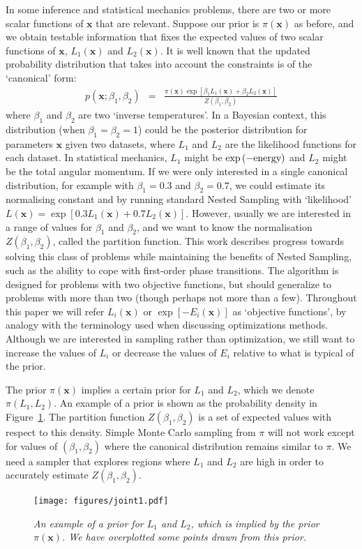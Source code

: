 \documentclass[journal,article,accept,moreauthors,pdftex,12pt,a4paper]{mdpi}
\newcommand{\xx}{\boldsymbol{x}}
\begin{document}
In some inference and
statistical mechanics problems, there are two or more scalar functions of
$\xx$ that are relevant. Suppose our prior is $\pi(\xx)$ as before, and
we obtain testable information that fixes the expected values of two scalar
functions of $\xx$, $L_1(\xx)$ and $L_2(\xx)$.
It is well known that the
updated probability distribution that takes into account the constraints is
of the `canonical' form:
\begin{eqnarray}
p(\xx; \beta_1, \beta_2) &=& \frac{\pi(\xx)\exp\left[\beta_1L_1(\xx)+\beta_2L_2(\xx)\right]}
{Z(\beta_1, \beta_2)}
\end{eqnarray}
where $\beta_1$ and $\beta_2$ are two `inverse temperatures'. In a Bayesian
context, this distribution (when $\beta_1 = \beta_2 = 1$) could be the
posterior distribution for parameters $\xx$
given two datasets, where $L_1$ and $L_2$ are the
likelihood functions for each dataset. In statistical mechanics, $L_1$ might
be $\exp\left(-\textnormal{energy}\right)$ and $L_2$ might be the total
angular momentum.
If we were only interested in a single canonical distribution, for example
with $\beta_1 = 0.3$ and $\beta_2 = 0.7$, we could estimate its normalising
constant and by running standard Nested Sampling with `likelihood'
$L(\xx) = \exp\left[0.3L_1(\xx) + 0.7L_2(\xx)\right]$. However, usually we
are interested in a range of values for $\beta_1$ and $\beta_2$, and we
want to know the normalisation $Z(\beta_1, \beta_2)$, called the
partition function. This work describes
progress towards solving this class of problems while maintaining the benefits
of Nested Sampling, such as the ability to cope with first-order phase
transitions. The algorithm is designed for problems with two objective
functions, but should generalize to problems with more than two (though perhaps
not more than a few). Throughout this paper we will refer $L_i(\xx)$ or
$\exp\left[-E_i(\xx)\right]$ as `objective functions',
by analogy with the terminology used when
discussing optimizations methods. Although we are interested in sampling rather
than optimization, we still want to increase the values of $L_i$ or decrease
the values of $E_i$ relative to what is typical of the prior.

The prior $\pi(\xx)$ implies a certain prior for $L_1$ and $L_2$, which we
denote $\pi(L_1, L_2)$. An example of a prior is shown as the
probability density in Figure~\ref{fig:joint1}. The partition function
$Z(\beta_1, \beta_2)$ is a set of expected values with respect to this density.
Simple Monte Carlo sampling from $\pi$ will not work except for values of
$(\beta_1, \beta_2)$ where the canonical distribution remains similar to $\pi$.
We need a sampler that explores regions where $L_1$ and $L_2$ are high in order
to accurately estimate $Z(\beta_1, \beta_2)$.
\begin{figure}
\centering
\texttt{[image: figures/joint1.pdf]}
\caption{\it An example of a prior for $L_1$ and $L_2$, which is implied by
the prior $\pi(\xx)$. We have overplotted some points drawn from this prior.
\label{fig:joint1}}
\end{figure}
\end{document}
